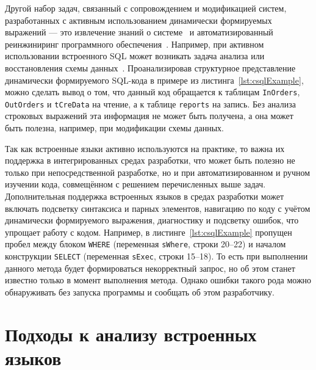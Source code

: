 Другой набор задач, связанный с сопровождением и модификацией систем, разработанных с активным использованием динамически формируемых выражений --- это  извлечение знаний о системе~\cite{DSQLSemaFRecovery} и автоматизированный реинжиниринг программного обеспечения~\cite{DSQLReverseEngineering}. Например, при активном использовании встроенного SQL может возникать задача анализа или восстановления схемы данных~\cite{DevelopmentDSQLTools}. Проанализировав структурное представление динамически формируемого SQL-кода в примере из листинга~\ref{lst:csqlExample}, можно сделать вывод о том, что данный код обращается к таблицам \verb|InOrders|, \verb|OutOrders| и \verb|tCreData| на чтение, а к таблице \verb|reports| на запись. Без анализа строковых выражений эта информация не может быть получена, а она может быть полезна, например, при модификации схемы данных.

Так как встроенные языки активно используются на практике, то важна их поддержка в интегрированных средах разработки, что может быть полезно не только при непосредственной разработке, но и при автоматизированном и ручном изучении кода, совмещённом с решением перечисленных выше задач. Дополнительная поддержка встроенных языков в средах разработки может включать подсветку синтаксиса и парных элементов, навигацию по коду с учётом динамически формируемого выражения, диагностику и подсветку ошибок, что упрощает работу с кодом. Например, в листинге~\ref{lst:csqlExample} пропущен пробел между блоком \verb|WHERE| (переменная \verb|sWhere|, строки 20--22) и началом конструкции \verb|SELECT| (переменная \verb|sExec|, строки 15--18). То есть при выполнении данного метода будет формироваться некорректный запрос, но об этом станет известно только в момент выполнения метода. Однако ошибки такого рода можно обнаруживать без запуска программы и сообщать об этом разработчику.

\section{Подходы к анализу встроенных языков}\label{SELAnalysisDescr}

